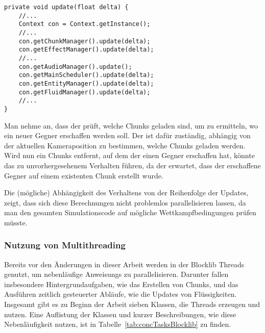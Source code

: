 \begin{lstlisting}[caption={Vereinfachte Update-Methode von \classGame{}.}, label={lst:gameUpdate},float={htbp}]
private void update(float delta) {
	//...
	Context con = Context.getInstance();
	//...
	con.getChunkManager().update(delta);
	con.getEffectManager().update(delta);
	//...
	con.getAudioManager().update();
	con.getMainScheduler().update(delta);
	con.getEntityManager().update(delta);
	con.getFluidManager().update(delta);
	//...
}
\end{lstlisting}

\begin{example}
Man nehme an, dass der \classEntityManager{} prüft, welche Chunks geladen sind, um zu ermitteln, wo ein neuer Gegner erschaffen werden soll. Der \classChunkManager{} ist dafür zuständig, abhängig von der aktuellen Kameraposition zu bestimmen, welche Chunks geladen werden. Wird nun ein Chunks entfernt, auf dem der \classEntityManager{} einen Gegner erschaffen hat, könnte das zu unvorhergesehenem Verhalten führen, da der \classEntityManager{} erwartet, dass der erschaffene Gegner auf einem existenten Chunk erstellt wurde.
\end{example}

Die (mögliche) Abhängigkeit des Verhaltens von der Reihenfolge der Updates, zeigt, dass sich diese Berechnungen nicht problemlos parallelisieren lassen, da man den gesamten Simulationscode auf mögliche Wettkampfbedingungen prüfen müsste.


\subsubsection{Nutzung von Multithreading}\label{sec:nutzungMultithreading}
Bereits vor den Änderungen in dieser Arbeit werden in der Blocklib Threads genutzt, um nebenläufige \glspl{Anweisung} zu parallelisieren. Darunter fallen insbesondere Hintergrundaufgaben, wie das Erstellen von Chunks, und das Ausführen zeitlich gesteuerter Abläufe, wie die Updates von Flüssigkeiten. Insgesamt gibt es zu Beginn der Arbeit sieben Klassen, die Threads erzeugen und nutzen. Eine Auflistung der Klassen und kurzer Beschreibungen, wie diese Nebenläufigkeit nutzen, ist in Tabelle~\ref{tab:concTasksBlocklib} zu finden.

